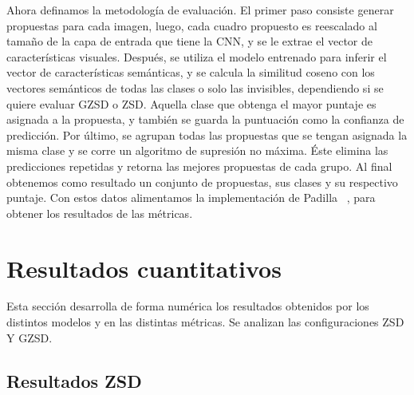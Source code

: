 Ahora definamos la metodología de evaluación. El primer paso consiste generar propuestas para cada imagen, luego, cada cuadro propuesto es reescalado al tamaño de la capa de entrada que tiene la CNN, y se le extrae el vector de características visuales. Después, se utiliza el modelo entrenado para inferir el vector de características semánticas, y se calcula la similitud coseno con los vectores semánticos de todas las clases o solo las invisibles, dependiendo si se quiere evaluar GZSD o ZSD. Aquella clase que obtenga el mayor puntaje es asignada a la propuesta, y también se guarda la puntuación como la confianza de predicción. Por último, se agrupan todas las propuestas que se tengan asignada la misma clase y se corre un algoritmo de supresión no máxima. Éste elimina las predicciones repetidas y retorna las mejores propuestas de cada grupo. Al final obtenemos como resultado un conjunto de propuestas, sus clases y su respectivo puntaje. Con estos datos alimentamos la implementación de Padilla \etal~\cite{padilla2020survey}, para obtener los resultados de las métricas.

\section{Resultados cuantitativos} \label{sec:resultadoscuantitativos}

Esta sección desarrolla de forma numérica los resultados obtenidos por los distintos modelos y en las distintas métricas. Se analizan las configuraciones ZSD Y GZSD.

\subsection{Resultados ZSD}

